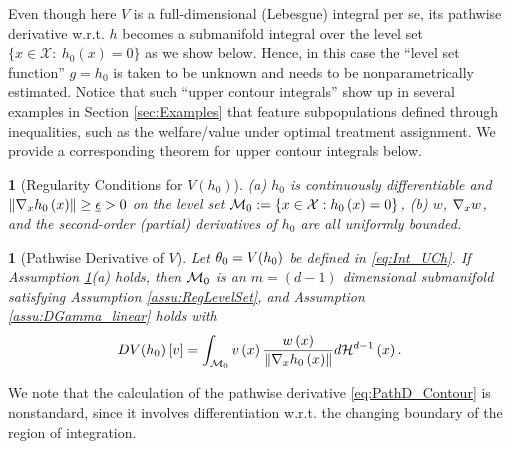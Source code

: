 \documentclass[12pt,american]{article}
\theoremstyle{definition}
\theoremstyle{plain}
\newtheorem{assumption}{\protect\assumptionname}
\theoremstyle{definition}
\theoremstyle{plain}
\newtheorem{lem}{\protect\lemmaname}
\theoremstyle{plain}
\theoremstyle{plain}
\theoremstyle{plain}
\theoremstyle{plain}
\newcommand{\norm}[1]{\left\| #1 \right\|}
\providecommand{\assumptionname}{Assumption}
\providecommand{\lemmaname}{Lemma}
\providecommand{\assumptionname}{Assumption}
\providecommand{\lemmaname}{Lemma}
\begin{document}
Even though here $V$ is a full-dimensional (Lebesgue) integral per se, its pathwise derivative w.r.t. $h$ becomes a submanifold integral over the level set $\{x\in\mathcal{X}:~h_0(x)=0\}$ as we show below. Hence, in this case the ``level set function''
$g=h_{0}$ is taken to be unknown and needs to be nonparametrically estimated. Notice that such ``upper contour integrals'' show up in several examples in Section \ref{sec:Examples} that feature subpopulations defined through inequalities, such as the welfare/value under optimal treatment assignment. We provide a corresponding theorem for upper contour integrals below.

\begin{assumption}[Regularity Conditions for $V(h_0)$]\label{assu:RegCond_Uch} (a) $h_{0}$ is continuously differentiable and $\norm{\Dif_{x}h_{0}\left(x\right)}\geq\ul{\e}>0$ on the level set  ${\mathcal{M}}_0:=\left\{ x\in{\cal X}:h_{0}\left(x\right)=0\right\}$, (b) $w$, $\nabla_{x} w$, and the second-order (partial) derivatives of $h_{0}$ are all uniformly bounded.
\end{assumption}
\begin{lem}[Pathwise Derivative of $V$]\label{lem:UCh-DV}
  Let $\theta_0=V(h_0)$ be defined in \eqref{eq:Int_UCh}. If Assumption \ref{assu:RegCond_Uch}(a) holds, then ${\cal M}_0$ is an $m=(d-1)$ dimensional submanifold satisfying Assumption \ref{assu:RegLevelSet}, and Assumption \ref{assu:DGamma_linear} holds with
  \begin{equation}
    DV(h_0)\left[v\right]=\int_{\cM_0}v\left(x\right)\frac{w\left(x\right)}{\norm{\Dif_{x}h_{0}\left(x\right)}}d{\cal H}^{d-1}\left(x\right).\label{eq:PathD_Contour}
  \end{equation}
\end{lem}
We note that the calculation of the pathwise derivative \eqref{eq:PathD_Contour}
is nonstandard, since it involves differentiation w.r.t. the changing boundary of the region of integration.
\end{document}
